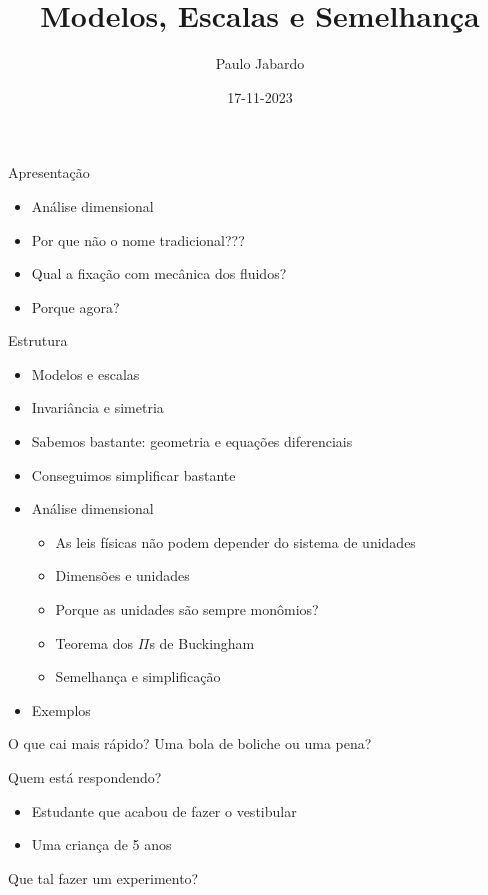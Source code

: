 \documentclass{beamer}
\title{Modelos, Escalas e Semelhança}
\author{Paulo Jabardo}
\date{17-11-2023}
\begin{document}
\maketitle

\begin{frame}{Apresentação}

  \begin{itemize}
  \item Análise dimensional
  \item Por que não o nome tradicional???
  \item Qual a fixação com mecânica dos fluidos?
  \item Porque agora?
  \end{itemize}
\end{frame}  

\begin{frame}{Estrutura}
  \begin{itemize}
  \item Modelos e escalas
  \item Invariância e simetria
  \item Sabemos bastante: geometria e equações diferenciais
  \item Conseguimos simplificar bastante
  \item Análise dimensional
    \begin{itemize}
    \item As leis físicas não podem depender do sistema de unidades
    \item Dimensões e unidades
    \item Porque as unidades são sempre monômios?
    \item Teorema dos $\Pi$s de Buckingham
    \item Semelhança e simplificação
    \end{itemize}
  \item Exemplos
  \end{itemize}
\end{frame}  

\begin{frame}{O que cai mais rápido? Uma bola de boliche ou uma pena?}

Quem está respondendo?
\begin{itemize}
 \item Estudante que acabou de fazer o vestibular
 \item Uma criança de 5 anos
\end{itemize}
 
Que tal fazer um experimento?

\end{frame}  
\end{document}
